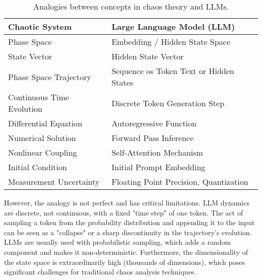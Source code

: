 \documentclass[a4paper,12pt]{article}
\begin{document}
\begin{table}[H]
\centering
\begin{tabular}{@{}ll@{}}
\toprule
\textbf{Chaotic System} & \textbf{Large Language Model (LLM)} \\ \midrule
Phase Space & Embedding / Hidden State Space \\
State Vector & Hidden State Vector \\
Phase Space Trajectory & Sequence os Token Text or Hidden States \\
Continuous Time Evolution & Discrete Token Generation Step \\
Differential Equation & Autoregressive Function \\
Numerical Solution & Forward Pass Inference \\
Nonlinear Coupling & Self-Attention Mechanism \\
Initial Condition & Initial Prompt Embedding \\
Measurement Uncertainty & Floating Point Precision, Quantization \\ \bottomrule
\end{tabular}
\caption{Analogies between concepts in chaos theory and LLMs.}
\label{tab:analogy}
\end{table}

However, the analogy is not perfect and has critical limitations. LLM dynamics are discrete, not continuous, with a fixed "time step" of one token. The act of sampling a token from the probability distribution and appending it to the input can be seen as a "collapse" or a sharp discontinuity in the trajectory's evolution. 
LLMs are usually used with probabilistic sampling, which adds a random component and makes it non-deterministic. Furthermore, the dimensionality of the state space is extraordinarily high (thousands of dimensions), which poses significant challenges for traditional chaos analysis techniques.


\end{document}
